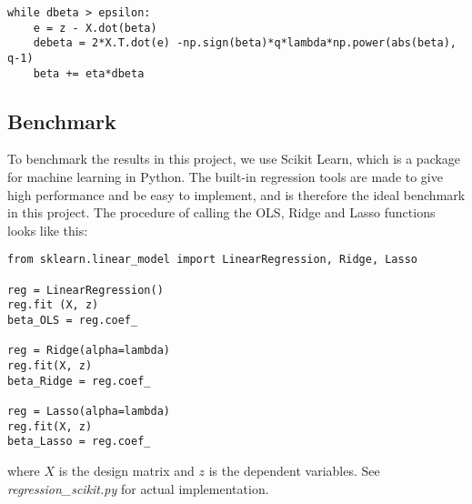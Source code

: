 \lstset{basicstyle=\scriptsize}
\begin{lstlisting}
while dbeta > epsilon:
	e = z - X.dot(beta)
    debeta = 2*X.T.dot(e) -np.sign(beta)*q*lambda*np.power(abs(beta), q-1)
    beta += eta*dbeta
\end{lstlisting}

\subsection{Benchmark}
To benchmark the results in this project, we use Scikit Learn, which is a package for machine learning in Python. \cite{Scikit} The built-in regression tools are made to give high performance and be easy to implement, and is therefore the ideal benchmark in this project. The procedure of calling the OLS, Ridge and Lasso functions looks like this:
\lstset{basicstyle=\scriptsize}
\begin{lstlisting}
from sklearn.linear_model import LinearRegression, Ridge, Lasso

reg = LinearRegression()
reg.fit (X, z) 
beta_OLS = reg.coef_

reg = Ridge(alpha=lambda)
reg.fit(X, z)
beta_Ridge = reg.coef_

reg = Lasso(alpha=lambda)
reg.fit(X, z)
beta_Lasso = reg.coef_
\end{lstlisting}
where $X$ is the design matrix and $z$ is the dependent variables. See \textit{regression\_scikit.py} for actual implementation. 